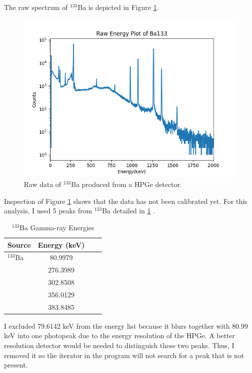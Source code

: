 The raw spectrum of $^{133}$Ba is depicted in Figure \ref{fig:raw_data}.

\begin{figure}[H]
\centering
\includegraphics[scale=0.8]{images/Raw_spectrum.png}
\caption{Raw data of $^{133}$Ba produced from a HPGe detector.}
\label{fig:raw_data}
\end{figure}

Inspection of Figure \ref{fig:raw_data} shows that the data has not been calibrated yet.
For this analysis, I used 5 peaks from $^{133}$Ba
detailed in \ref{table:energy} \cite{Untitled27:online}.

\begin{table}[H]
\caption{$^{133}$Ba Gamma-ray Energies}
\begin{center}
\begin{tabular}{|l|c|c|r|}
\textbf{Source} & \textbf{Energy (keV)}\\
\hline
$^{133}$Ba    &  80.9979 \\
              &  276.3989 \\
              & 302.8508  \\
              & 356.0129 \\
              & 383.8485 \\
\hline
\end{tabular}
\end{center}
\label{table:energy}
\end{table}

I excluded 79.6142 keV from the energy list because it blurs together with
80.99 keV into one photopeak due to the energy resolution
of the HPGe. A better resolution detector would be needed to distinguish
these two peaks. Thus, I removed it so the iterator in the program will
not search for a peak that is not present.

